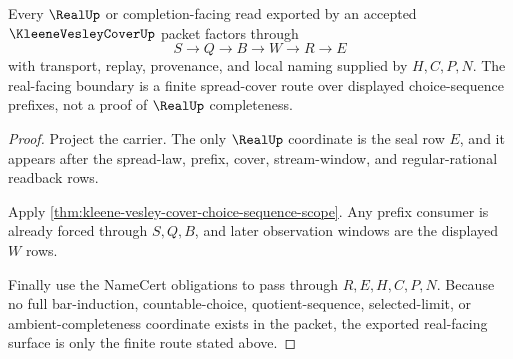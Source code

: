 \begin{theorem}
\label{thm:kleene-vesley-cover-real-completion-boundary}
Every $\RealUp$ or completion-facing read exported by an accepted $\KleeneVesleyCoverUp$ packet factors through
$$
S \longrightarrow Q \longrightarrow B \longrightarrow W \longrightarrow R \longrightarrow E
$$
with transport, replay, provenance, and local naming supplied by $H,C,P,N$. The real-facing boundary is a finite spread-cover route over displayed choice-sequence prefixes, not a proof of $\RealUp$ completeness.
\end{theorem}
\begin{proof}
Project the carrier. The only $\RealUp$ coordinate is the seal row $E$, and it appears after the spread-law, prefix, cover, stream-window, and regular-rational readback rows.

Apply \autoref{thm:kleene-vesley-cover-choice-sequence-scope}. Any prefix consumer is already forced through $S,Q,B$, and later observation windows are the displayed $W$ rows.

Finally use the NameCert obligations to pass through $R,E,H,C,P,N$. Because no full bar-induction, countable-choice, quotient-sequence, selected-limit, or ambient-completeness coordinate exists in the packet, the exported real-facing surface is only the finite route stated above.
\end{proof}





